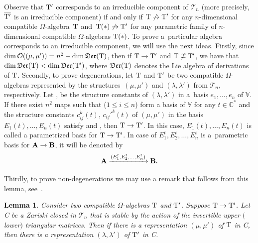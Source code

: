 \documentclass[10pt,a4paper]{amsart}
\numberwithin{equation}{section}
\newtheorem{Lemma}[Theorem]{Lemma}
\begin{document}
Observe that ${\rm T}'$ corresponds to an irreducible component of $\mathcal{T}_n$ (more precisely, $\overline{{\rm T}'}$ is an irreducible component) if and only if ${{\rm T} }\not\to {{\rm T} }'$ for any $n$-dimensional compatible $\Omega$-algebra~${\rm T}$ and~${{{\rm T}(*) }\not\to {{\rm T} }'}$ for any parametric family of $n$-dimensional compatible $\Omega$-algebras ${\rm T}(*)$. To prove a~particular algebra corresponds to an irreducible component, we will use the next ideas.
Firstly, since $\operatorname{dim}{\mathcal O}((\mu, \mu')) = n^2 - \operatorname{dim}\mathfrak{Der}({\rm T})$, then if $ {\rm T} \to {\rm T} '$ and ${\rm T} \not\cong {\rm T} '$, we have that $\operatorname{dim}\mathfrak{Der}( {\rm T} )<\operatorname{dim}\mathfrak{Der}( {\rm T} ')$, where $\mathfrak{Der}( {\rm T} )$ denotes the Lie algebra of derivations of ${\rm T} $.
Secondly, to prove degenerations, let ${{\rm T} }$ and ${{\rm T} }'$ be two compatible $\Omega$-algebras represented by the structures~$(\mu, \mu')$ and $(\lambda, \lambda')$ from ${{\mathcal T} }_n$, respectively. Let ,  be the structure constants of $(\lambda, \lambda')$ in a~basis $e_1,\dots, e_n$ of ${\mathbb V}$. If there exist $n^2$ maps  such that  ($1\leq i \leq n$) form a basis of ${\mathbb V}$ for any $t\in\mathbb{C}^*$ and the structure constants $c_{ij}^k(t)$, $c_{ij}'^k(t)$ of $(\mu, \mu')$ in the basis $E_1(t),\dots, E_n(t)$ satisfy  and , then ${{\rm T} }\to {{\rm T} }'$. In this case, $E_1(t),\dots, E_n(t)$ is called a parametrized basis for ${{\rm T} }\to {{\rm T} }'$.
In case of $E_1^t, E_2^t, \ldots, E_n^t$ is a~parametric basis for ${\bf A}\to {\bf B}$, it will be denoted by
\[
{\bf A}\xrightarrow{(E_1^t, E_2^t, \ldots, E_n^t)} {\bf B}.
\]

Thirdly, to prove non-degenerations we may use a remark that follows from this lemma, see~\cite{afm}.

\begin{Lemma} %
Consider two compatible $\Omega$-algebras ${\rm T}$ and ${\rm T}'$. Suppose ${\rm T} \to {\rm T}'$. Let C be a Zariski closed in ${\mathcal T}_n$ that is stable by the action of the invertible upper $($lower$)$ triangular matrices. Then if there is a representation $(\mu, \mu')$ of ${\rm T}$ in C, then there is a representation $(\lambda, \lambda')$ of ${\rm T}'$ in C.
\end{Lemma}
\end{document}
